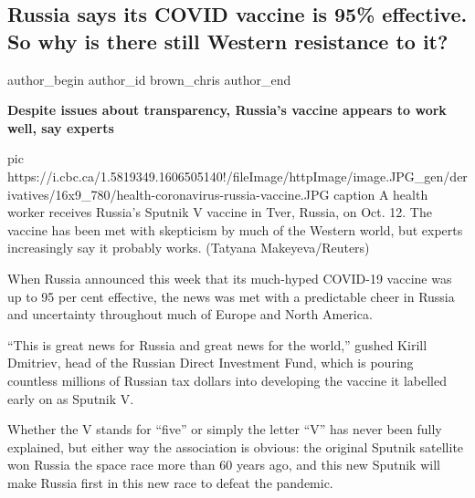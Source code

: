  
 
 
 
 
 
\subsection{Russia says its COVID vaccine is 95\% effective. So why is there still Western resistance to it?}
\label{sec:28_11_2020.news.world.cbc_ca.brown_chris.1.russia_vaccine_effectiveness}
\ifcmt
  author_begin
   author_id brown_chris
  author_end
\fi


\begin{leftbar}
\bfseries
Despite issues about transparency, Russia's vaccine appears to work well, say experts
\end{leftbar}

\ifcmt
pic https://i.cbc.ca/1.5819349.1606505140!/fileImage/httpImage/image.JPG_gen/derivatives/16x9_780/health-coronavirus-russia-vaccine.JPG
caption A health worker receives Russia's Sputnik V vaccine in Tver, Russia, on Oct. 12. The vaccine has been met with skepticism by much of the Western world, but experts increasingly say it probably works. (Tatyana Makeyeva/Reuters)
\fi

When Russia announced this week that its much-hyped COVID-19 vaccine was up to
95 per cent effective, the news was met with a predictable cheer in Russia and
uncertainty throughout much of Europe and North America.

\enquote{This is great news for Russia and great news for the world,} gushed Kirill
Dmitriev, head of the Russian Direct Investment Fund, which is pouring
countless millions of Russian tax dollars into developing the vaccine it
labelled early on as Sputnik V.

Whether the V stands for \enquote{five} or simply the letter \enquote{V} has
never been fully explained, but either way the association is obvious: the
original Sputnik satellite won Russia the space race more than 60 years ago,
and this new Sputnik will make Russia first in this new race to defeat the
pandemic.

